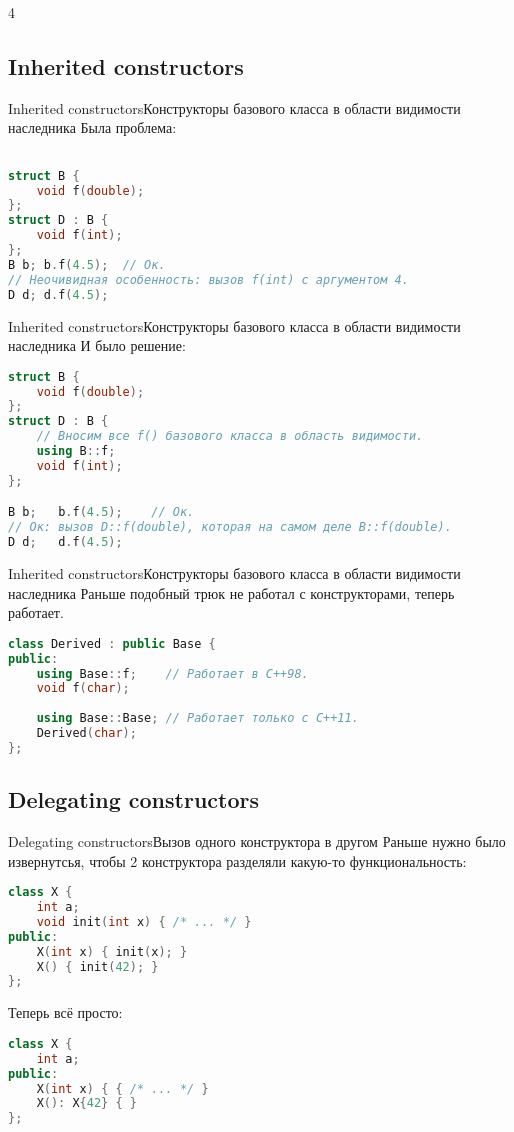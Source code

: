 4\documentclass[10pt]{beamer}
\begin{document}
\subsection{Inherited constructors}
\hypertarget{Inherited constructors}{}
\begin{frame}[fragile]{Inherited constructors}{Конструкторы базового класса в области видимости наследника}
Была проблема:
\begin{lstlisting}[language=C++]

struct B {
    void f(double);
};
struct D : B {
    void f(int);
};
B b; b.f(4.5);	// Ок.
// Неочивидная особенность: вызов f(int) с аргументом 4.
D d; d.f(4.5);	
\end{lstlisting}
\end{frame}
\begin{frame}[fragile]{Inherited constructors}{Конструкторы базового класса в области видимости наследника}
И было решение:
\begin{lstlisting}[language=C++]
struct B {
    void f(double);
};
struct D : B {
    // Вносим все f() базового класса в область видимости.
    using B::f; 
    void f(int);
};

B b;   b.f(4.5);	// Ок.
// Ок: вызов D::f(double), которая на самом деле B::f(double).
D d;   d.f(4.5);	
\end{lstlisting}
\end{frame}
\begin{frame}[fragile]{Inherited constructors}{Конструкторы базового класса в области видимости наследника}
Раньше подобный трюк не работал с конструкторами, теперь работает.
\begin{lstlisting}[language=C++]
class Derived : public Base { 
public: 
    using Base::f;    // Работает в C++98.
    void f(char);
    
    using Base::Base; // Работает только с C++11.
    Derived(char);
}; 
\end{lstlisting}
\end{frame}

\subsection{Delegating constructors}
\hypertarget{Delegating constructors}{}
\begin{frame}[fragile]{Delegating constructors}{Вызов одного конструктора в другом}
Раньше нужно было извернутсья, чтобы 2 конструктора разделяли какую-то функциональность:
\begin{lstlisting}[language=C++]
class X {
    int a;
    void init(int x) { /* ... */ }
public:
    X(int x) { init(x); }
    X() { init(42); }
};
\end{lstlisting}
Теперь всё просто:
\begin{lstlisting}[language=C++]
class X {
    int a;
public:
    X(int x) { { /* ... */ }
    X(): X{42} { }
};
\end{lstlisting}
\end{frame}
\end{document}

